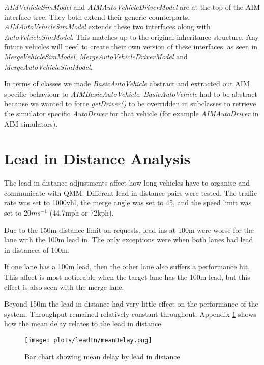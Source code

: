 \begin{appendices}
\emph{AIMVehicleSimModel} and \emph{AIMAutoVehicleDriverModel} are at the top of the AIM interface tree. They both extend their generic counterparts. \emph{AIMAutoVehicleSimModel} extends these two interfaces along with \emph{AutoVehicleSimModel}. This matches up to the original inheritance structure. Any future vehicles will need to create their own version of these interfaces, as seen in \emph{MergeVehicleSimModel}, \emph{MergeAutoVehicleDriverModel} and \emph{MergeAutoVehicleSimModel}. 

In terms of classes we made \emph{BasicAutoVehicle} abstract and extracted out AIM specific behaviour to \emph{AIMBasicAutoVehicle}. \emph{BasicAutoVehicle} had to be abstract because we wanted to force \emph{getDriver()} to be overridden in subclasses to retrieve the simulator specific \emph{AutoDriver} for that vehicle (for example \emph{AIMAutoDriver} in AIM simulators). 

\FloatBarrier
\section{Lead in Distance Analysis}
\label{sec:Lead in Distance Analysis}
The lead in distance adjustments affect how long vehicles have to organise and communicate with QMM. Different lead in distance pairs were tested. The traffic rate was set to 1000\si{vhl}, the merge angle was set to 45\degree, and the speed limit was set to 20$\si{ms^{-1}}$ (44.7\si{mph} or 72\si{kph}).

Due to the 150\si{m} distance limit on requests, lead ins at 100\si{m} were worse for the lane with the 100\si{m} lead in. The only exceptions were when both lanes had lead in distances of 100\si{m}.

If one lane has a 100\si{m} lead, then the other lane also suffers a performance hit. This affect is most noticeable when the target lane has the 100\si{m} lead, but this effect is also seen with the merge lane. 

Beyond 150\si{m} the lead in distance had very little effect on the performance of the system. Throughput remained relatively constant throughout. Appendix \ref{fig:meanDelayLeadIn} shows how the mean delay relates to the lead in distance.

\begin{figure}[p]
\centerline{
	\texttt{[image: plots/leadIn/meanDelay.png]}
}
\caption{Bar chart showing mean delay by lead in distance}
\label{fig:meanDelayLeadIn}
\end{figure}
\end{appendices}